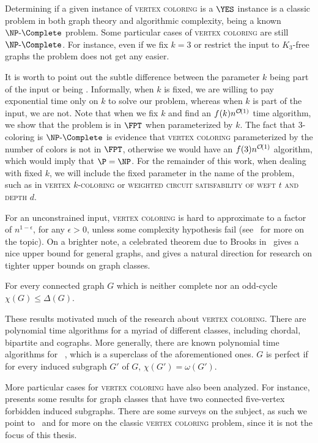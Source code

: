 Determining if a given instance of \textsc{vertex coloring} is a $\YES$ instance is a classic problem in both graph theory and algorithmic complexity, being a known $\NPc$ problem.
Some particular cases of \textsc{vertex coloring} are still $\NPc$.
For instance, even if we fix $k=3$ or restrict the input to $K_3$-free graphs the problem does not get any easier.

It is worth to point out the subtle difference between the parameter $k$ being part of the input or being .
Informally, when $k$ is fixed, we are willing to pay exponential time only on $k$ to solve our problem, whereas when $k$ is part of the input, we are not.
Note that when we fix $k$ and find an $f(k)n^{\mathcal{O}\!\left(1\right)}$ time algorithm, we show that the problem is in $\FPT$ when parameterized by $k$.
The fact that $3$-coloring is $\NPc$ is evidence that \textsc{vertex coloring} parameterized by the number of colors is not in $\FPT$, otherwise we would have an $f(3)n^{\mathcal{O}\!\left(1\right)}$ algorithm, which would imply that $\P = \NP$. 
For the remainder of this work, when dealing with fixed $k$, we will include the fixed parameter in the name of the problem, such as in \textsc{vertex $k$-coloring} or \textsc{weighted circuit satisfability of weft $t$ and depth $d$}.

For an unconstrained input, \textsc{vertex coloring} is hard to approximate to a factor of $n^{1-\epsilon}$, for any $\epsilon > 0$, unless some complexity hypothesis fail (see~\citep{color_zpp} for more on the topic).
On a brighter note, a celebrated theorem due to Brooks in~\citep{brooks_theorem} gives a nice upper bound for general graphs, and gives a natural direction for research on tighter upper bounds on graph classes.

\begin{theorem*}
    For every connected graph $G$ which is neither complete nor an odd-cycle $\chi(G) \leq \Delta(G)$.
\end{theorem*}

These results motivated much of the research about \textsc{vertex coloring}.
There are polynomial time algorithms for a myriad of different classes, including chordal, bipartite and cographs.
More generally, there are known polynomial time algorithms for ~\citep{perfect_polynomial}, which is a superclass of the aforementioned ones.
$G$ is perfect if for every induced subgraph $G'$ of $G$, $\chi(G') = \omega(G')$.

More particular cases for \textsc{vertex coloring} have also been analyzed. For instance, \citep{coloring_art} presents some results for graph classes that have two connected five-vertex forbidden induced subgraphs. There are some surveys on the subject, as such we point to~\citep{coloring_survey} and \citep{coloring_survey2} for more on the classic \textsc{vertex coloring} problem, since it is not the focus of this thesis.


